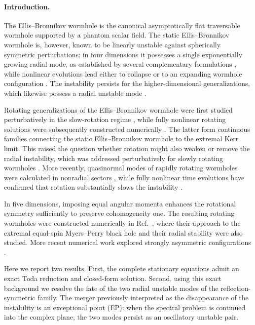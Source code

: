 \documentclass[aps,prl,reprint,superscriptaddress,nofootinbib,floatfix]{revtex4-2}
\begin{document}
\maketitle

\paragraph{Introduction.}
The Ellis--Bronnikov wormhole \cite{Ellis:1973yv,Bronnikov:1973fh} is the canonical asymptotically flat traversable wormhole supported by a phantom scalar field.
The static Ellis–Bronnikov wormhole is, however, known to be linearly unstable against spherically symmetric perturbations: in four dimensions it possesses a single exponentially growing radial mode, as established by several complementary formulations \cite{Gonzalez:2008wd,Bronnikov:2011if,Cremona:2018wkj,Cremona:2019wiy}, while nonlinear evolutions lead either to collapse or to an expanding wormhole configuration \cite{Shinkai:2002gv,Gonzalez:2008xk}. 
The instability persists for the higher-dimensional generalizations, which likewise possess a radial unstable mode \cite{Torii:2013xba}. 

Rotating generalizations of the Ellis--Bronnikov wormhole were first studied perturbatively in the slow-rotation regime \cite{Kashargin:2007mm,Kashargin:2008pk}, while fully nonlinear rotating solutions were subsequently constructed numerically \cite{Kleihaus:2014dla,Chew:2016epf}. 
The latter form continuous families connecting the static Ellis--Bronnikov wormhole to the extremal Kerr limit. 
This raised the question whether rotation might also weaken or remove the radial instability, which was addressed perturbatively for slowly rotating wormholes \cite{Azad:2023iju,Azad:2024axu}.
More recently, quasinormal modes of rapidly rotating wormholes were calculated in nonradial sectors \cite{Khoo:2024yeh}, while fully nonlinear time evolutions have confirmed that rotation substantially slows the instability \cite{Shirokov:2026otu}.

In five dimensions, imposing equal angular momenta enhances the rotational
symmetry sufficiently to preserve cohomogeneity one.  
The resulting rotating wormholes were constructed numerically in Ref.~\cite{Dzhunushaliev:2013jja}, where their approach to the extremal equal-spin Myers--Perry black hole \cite{Myers:1986un} and their radial stability were also studied.  
More recent numerical work explored strongly asymmetric configurations \cite{Uemichi:2026dzb}.

Here we report two results.  
First, the complete stationary equations admit an exact Toda reduction and closed-form solution.  
Second, using this exact background we resolve the fate of the two radial unstable modes of the reflection-symmetric family.  
The merger previously interpreted as the disappearance of the instability is an exceptional point (EP): 
when the spectral problem is continued into the complex plane, the two modes persist as an oscillatory unstable pair.  
\end{document}
